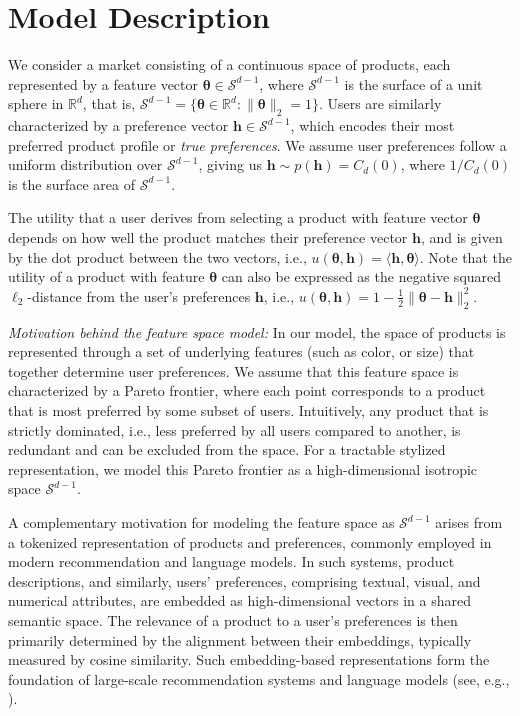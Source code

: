 \documentclass[12pt]{article}
\theoremstyle{definition}
\theoremstyle{remark}
\begin{document}
\section{Model Description}
We consider a market consisting of a continuous space of products, each represented by a feature vector $\boldsymbol \theta \in \mathcal{S}^{d-1}$, where $\mathcal{S}^{d-1}$ is the surface of a unit sphere in $\mathbb R^d$, that is, $\mathcal{S}^{d-1} = \{ \boldsymbol \theta \in \mathbb R^d : \|\boldsymbol \theta \|_2 = 1 \}$. Users are similarly characterized by a preference vector $\mathbf h \in \mathcal{S}^{d-1}$, which encodes their most preferred product profile or \textit{true preferences}. We assume user preferences follow a uniform distribution over $\mathcal{S}^{d-1}$, giving us $\mathbf h\sim p(\mathbf h) = C_d(0)$, where $1/C_d(0)$ is the surface area of $\mathcal{S}^{d-1}$.

The utility that a user derives from selecting a product with feature vector $\boldsymbol \theta$ depends on how well the product matches their preference vector $\mathbf h$, and is given by the dot product between the two vectors, i.e., $u(\boldsymbol \theta, \mathbf  h) = \langle \mathbf h , \boldsymbol \theta \rangle$. Note that the utility of a product with feature $\boldsymbol \theta$ can also be expressed as the negative squared $\ell_2$-distance from the user's preferences $\mathbf h$, i.e., $u(\boldsymbol\theta , \mathbf h) =1 -\frac{1}{2}\|\boldsymbol \theta -\mathbf h\|^2_2$.

\textit{Motivation behind the feature space model:}
In our model, the space of products is represented through a set of underlying features (such as color, or size) that together determine user preferences. We assume that this feature space is characterized by a Pareto frontier, where each point corresponds to a product that is most preferred by some subset of users. Intuitively, any product that is strictly dominated, i.e., less preferred by all users compared to another, is redundant and can be excluded from the space. For a tractable stylized representation, we model this Pareto frontier as a high-dimensional isotropic space $\mathcal{S}^{d-1}$.

A complementary motivation for modeling the feature space as $\mathcal{S}^{d-1}$ arises from a tokenized representation of products and preferences, commonly employed in modern recommendation and language models. In such systems, product descriptions, and similarly, users' preferences, comprising textual, visual, and numerical attributes, are embedded as high-dimensional vectors in a shared semantic space. The relevance of a product to a user’s preferences is then primarily determined by the alignment between their embeddings, typically measured by cosine similarity. Such embedding-based representations form the foundation of large-scale recommendation systems and language models (see, e.g., \citealt{barkan2016item2vec}).
\end{document}
